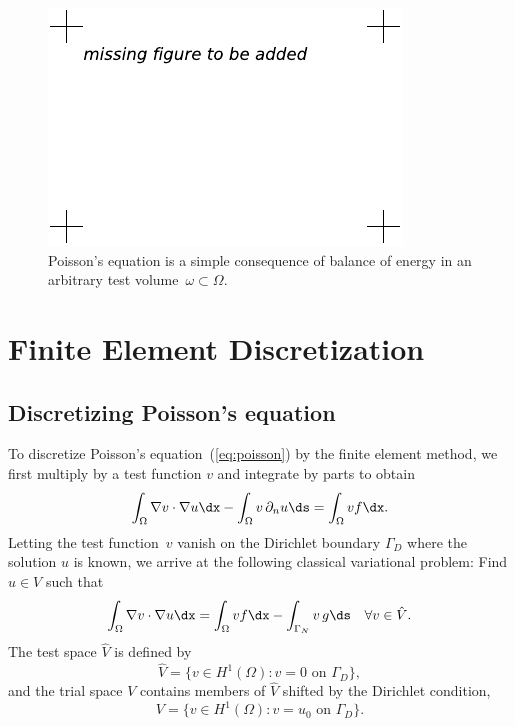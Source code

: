 \begin{figure}
  \begin{center}
    \includegraphics[width=\largefig]{chapters/kirby-7/pdf/missing-figure.pdf}
    \caption{Poisson's equation is a simple consequence of balance of
      energy in an arbitrary test volume~$\omega \subset \Omega$.}
  \end{center}
\end{figure}

\section{Finite Element Discretization}

\subsection{Discretizing Poisson's equation}

To discretize Poisson's equation~(\ref{eq:poisson}) by the finite
element method, we first multiply by a test function $v$ and integrate
by parts to obtain
\begin{displaymath}
  \int_{\Omega} \nabla v \cdot \nabla u \dx
  - \int_{\Omega} v \, \partial_n u \ds
  =
  \int_{\Omega} v f \dx.
\end{displaymath}
Letting the test function~$v$ vanish on the Dirichlet boundary
$\Gamma_D$ where the solution $u$ is known, we arrive at the following
classical variational problem: Find $u \in V$ such that
\begin{equation} \label{eq:poisson,varproblem}
  \int_{\Omega} \nabla v \cdot \nabla u \dx =
  \int_{\Omega} v f \dx - \int_{\Gamma_N} v \, g \ds
  \quad \forall v \in \hat{V}.
\end{equation}
The test space $\hat{V}$ is defined by
\begin{displaymath}
  \hat{V} = \{v \in H^1(\Omega) : v = 0 \mbox{ on } \Gamma_D\},
\end{displaymath}
and the trial space \( V \) contains members of \( \hat{V} \) shifted
by the Dirichlet condition,
\begin{displaymath}
  V = \{ v \in H^1(\Omega) : v = u_0 \mbox{ on } \Gamma_D \}.
\end{displaymath}

